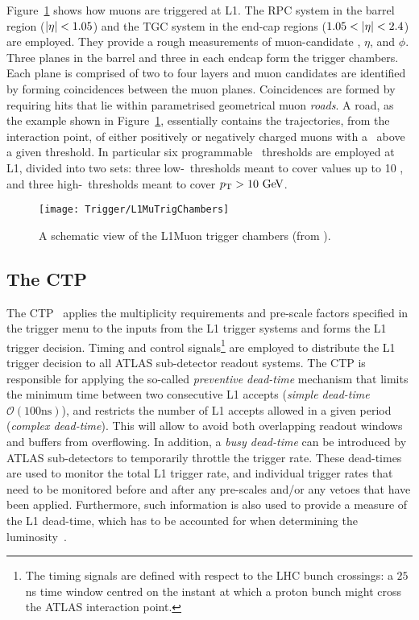 			Figure~\ref{fig:L1MuTrig} shows how muons are triggered at \ac{L1}. The \ac{RPC} system in the barrel region ($|\eta| < 1.05$) and the \ac{TGC} system in the end-cap regions ($1.05 < |\eta| < 2.4$) are employed. They provide a rough measurements of muon-candidate \pt, $\eta$, and $\phi$. Three planes in the barrel and three in each endcap form the trigger chambers. Each plane is comprised of two to four layers and muon candidates are identified by forming coincidences between the muon planes. Coincidences are formed by requiring hits that lie within parametrised geometrical muon \emph{roads}. A road, as the example shown in Figure~\ref{fig:L1MuTrig}, essentially contains the trajectories, from the interaction point, of either positively or negatively charged muons with a \pt\ above a given threshold. In particular six programmable \pt\ thresholds are employed at \ac{L1}, divided into two sets: three low-\pt\ thresholds meant to cover values up to 10 \GeV, and three high-\pt\ thresholds meant to cover $\pt > 10 \GeV$.

			\begin{figure}[!htb]
				\centering
				\texttt{[image: Trigger/L1MuTrigChambers]}
				\caption{\label{fig:L1MuTrig} A schematic view of the \ac{L1Muon} trigger chambers (from \cite{ATLASTrigger2010}).}
			\end{figure}


		\subsection*{The CTP}

			The \ac{CTP}~\cite{ATLASJINST} applies the multiplicity requirements and pre-scale factors specified in the trigger menu to the inputs from the \ac{L1} trigger systems and forms the \ac{L1} trigger decision. Timing and control signals\footnote{The timing signals are defined with respect to the \ac{LHC} bunch crossings: a $25$ ns time window centred on the instant at which a proton bunch might cross the \ac{ATLAS} interaction point.} are employed to distribute the \ac{L1} trigger decision to all \ac{ATLAS} sub-detector readout systems. The \ac{CTP} is responsible for applying the so-called \emph{preventive dead-time} mechanism that limits the minimum time between two consecutive \ac{L1} accepts (\emph{simple dead-time} $\mathcal{O}(100 \mathrm{ns})$), and restricts the number of L1 accepts allowed in a given period (\emph{complex dead-time}). This will allow to avoid both overlapping readout windows and buffers from overflowing. In addition, a \emph{busy dead-time} can be introduced by \ac{ATLAS} sub-detectors to temporarily throttle the trigger rate. These dead-times are used to monitor the total \ac{L1} trigger rate, and individual trigger rates that need to be monitored before and after any pre-scales and/or any vetoes that have been applied. Furthermore, such information is also used to provide a measure of the \ac{L1} dead-time, which has to be accounted for when determining the luminosity~\cite{ATLASTrigger2010}.

